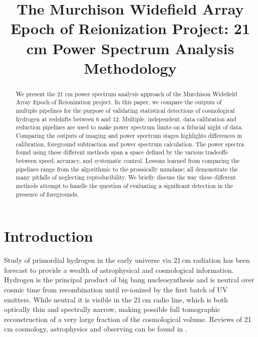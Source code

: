 \documentclass[twolcolumn,iop]{emulateapj}
\begin{document}

\title{The Murchison Widefield Array Epoch of Reionization Project: 21 cm Power Spectrum Analysis Methodology}





\begin{abstract}
We present the 21 cm power spectrum analysis approach of the Murchison Widefield Array Epoch of Reionization project.  In this paper, we compare the outputs of multiple pipelines for the purpose of validating statistical detections of cosmological hydrogen at redshifts between 6 and 12. Multiple, independent, data calibration and reduction pipelines are used to make power spectrum limits on a fiducial night of data.  Comparing the outputs of imaging and power spectrum stages highlights differences in calibration, foreground subtraction and power spectrum calculation. The power spectra found using these different methods span a space defined by the various tradeoffs between speed, accuracy, and systematic control.  Lessons learned from comparing the pipelines range from the algorithmic to the prosaically mundane; all demonstrate the many pitfalls of neglecting reproducibility. We briefly discuss the way these different methods attempt to handle the question of evaluating a significant detection in the presence of foregrounds.


\end{abstract}







\section{Introduction} 
  Study of primordial hydrogen  in the early universe via 21\,cm radiation has been forecast to provide a wealth of astrophysical and cosmological information.   Hydrogen is the principal product of big bang nucleosynthesis and is neutral over cosmic time from recombination until re-ionized by the first batch of UV emitters. While neutral it is visible in the 21\,cm radio line, which is both optically thin and spectrally narrow, making possible full tomographic reconstruction of a very large fraction of the cosmological volume.  Reviews of 21 cm cosmology, astrophysics and observing can be found in \cite{Morales:2010p8093,Furlanetto:2006p2267,Pritchard:2012p9555,zaroubi2013epoch}.
  
\end{document}
